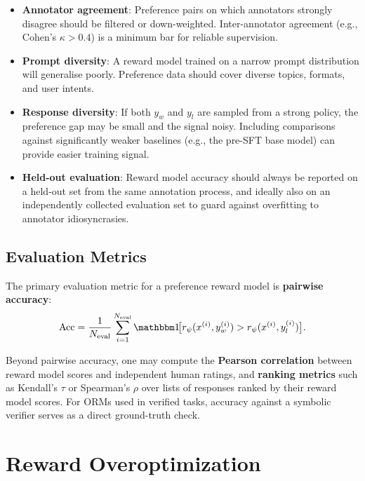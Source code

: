 \begin{itemize}[leftmargin=*]
  \item \textbf{Annotator agreement}: Preference pairs on which annotators strongly disagree should be filtered or down-weighted. Inter-annotator agreement (e.g., Cohen's $\kappa > 0.4$) is a minimum bar for reliable supervision.
  \item \textbf{Prompt diversity}: A reward model trained on a narrow prompt distribution will generalise poorly. Preference data should cover diverse topics, formats, and user intents.
  \item \textbf{Response diversity}: If both $y_w$ and $y_l$ are sampled from a strong policy, the preference gap may be small and the signal noisy. Including comparisons against significantly weaker baselines (e.g., the pre-SFT base model) can provide easier training signal.
  \item \textbf{Held-out evaluation}: Reward model accuracy should always be reported on a held-out set from the same annotation process, and ideally also on an independently collected evaluation set to guard against overfitting to annotator idiosyncrasies.
\end{itemize}

\subsection{Evaluation Metrics}

The primary evaluation metric for a preference reward model is \textbf{pairwise accuracy}:
\begin{equation}
\label{eq:rm-accuracy}
\mathrm{Acc} = \frac{1}{N_{\mathrm{eval}}}\sum_{i=1}^{N_{\mathrm{eval}}} \ind\!\bigl[r_\psi(x^{(i)}, y_w^{(i)}) > r_\psi(x^{(i)}, y_l^{(i)})\bigr].
\end{equation}

Beyond pairwise accuracy, one may compute the \textbf{Pearson correlation} between reward model scores and independent human ratings, and \textbf{ranking metrics} such as Kendall's $\tau$ or Spearman's $\rho$ over lists of responses ranked by their reward model scores. For ORMs used in verified tasks, accuracy against a symbolic verifier serves as a direct ground-truth check.

\section{Reward Overoptimization}
\label{sec:overoptimization}

